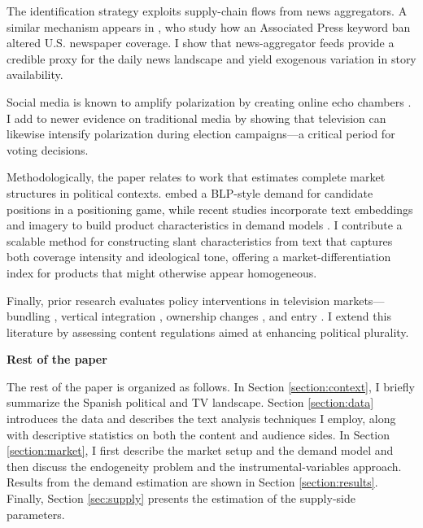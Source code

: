\documentclass[12pt]{article}
\begin{document}
The identification strategy exploits supply-chain flows from news aggregators. A similar mechanism appears in \citet{milena}, who study how an Associated Press keyword ban altered U.S. newspaper coverage. I show that news-aggregator feeds provide a credible proxy for the daily news landscape and yield exogenous variation in story availability.

Social media is known to amplify polarization by creating online echo chambers \citep{bail2018exposure,Zhuravskaya2020}. I add to newer evidence on traditional media \citep{schneider2025media} by showing that television can likewise intensify polarization during election campaigns—a critical period for voting decisions.

Methodologically, the paper relates to work that estimates complete market structures in political contexts. \citet{longuet-marx2025party} embed a BLP-style demand for candidate positions in a positioning game, while recent studies incorporate text embeddings and imagery to build product characteristics in demand models \citep{compiani2025demandestimationtextimage}. I contribute a scalable method for constructing slant characteristics from text that captures both coverage intensity and ideological tone, offering a market-differentiation index for products that might otherwise appear homogeneous.

Finally, prior research evaluates policy interventions in television markets—bundling \citep{crawford_yurukoglu}, vertical integration \citep{crawford_vertical}, ownership changes \citep{MARTIN_McCRAIN_2019,CageHengelHerveUrvoy2022}, and entry \citep{prat_stromberg_entry}. I extend this literature by assessing content regulations aimed at enhancing political plurality.

\textbf{Rest of the paper}

The rest of the paper is organized as follows. In Section \ref{section:context}, I briefly summarize the Spanish political and TV landscape. Section \ref{section:data} introduces the data and describes the text analysis techniques I employ, along with descriptive statistics on both the content and audience sides. In Section \ref{section:market}, I first describe the market setup and the demand model and then discuss the endogeneity problem and the instrumental-variables approach. Results from the demand estimation are shown in Section \ref{section:results}. Finally, Section \ref{sec:supply} presents the estimation of the supply-side parameters.

	
	
\end{document}
